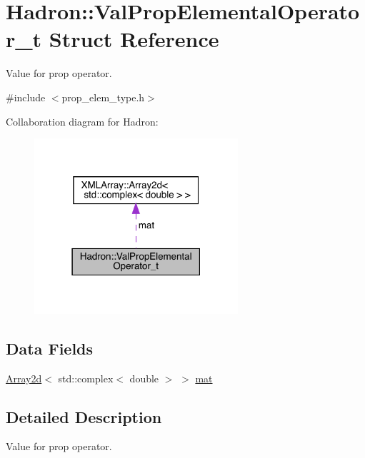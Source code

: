 \hypertarget{structHadron_1_1ValPropElementalOperator__t}{}\section{Hadron\+:\+:Val\+Prop\+Elemental\+Operator\+\_\+t Struct Reference}
\label{structHadron_1_1ValPropElementalOperator__t}


Value for prop operator.  




{\ttfamily \#include $<$prop\+\_\+elem\+\_\+type.\+h$>$}



Collaboration diagram for Hadron\+:\nopagebreak
\begin{figure}[H]
\begin{center}
\leavevmode
\includegraphics[width=214pt]{d7/d3c/structHadron_1_1ValPropElementalOperator__t__coll__graph}
\end{center}
\end{figure}
\subsection*{Data Fields}
\begin{DoxyCompactItemize}
\item 
\mbox{\hyperlink{classXMLArray_1_1Array2d}{Array2d}}$<$ std\+::complex$<$ double $>$ $>$ \mbox{\hyperlink{structHadron_1_1ValPropElementalOperator__t_aee3c0c872145b334c5ee5dbd0f2e0f2d}{mat}}
\end{DoxyCompactItemize}


\subsection{Detailed Description}
Value for prop operator. 

